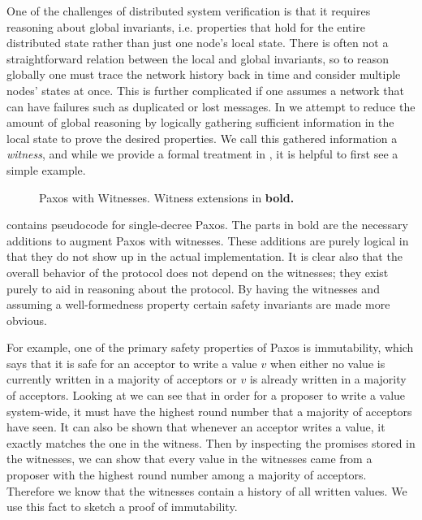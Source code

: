 One of the challenges of distributed system verification is that it requires reasoning about
global invariants, i.e. properties that hold for the entire distributed state rather than just
one node's local state.
There is often not a straightforward relation between the local and global invariants, so
to reason globally one must trace the network history back in time and consider multiple
nodes' states at once.
This is further complicated if one assumes a network that can have failures such as duplicated
or lost messages.
In \sysname{} we attempt to reduce the amount of global reasoning by logically gathering sufficient
information in the local state to prove the desired properties.
We call this gathered information a \textit{witness}, and while we provide a formal treatment
in , it is helpful to first see a simple example.

\begin{figure}[t]
\begin{minipage}{\linewidth}
\noindent
\begin{multicols}{3}
  
\end{multicols}
\end{minipage}
\vspace{-1em}
\caption{Paxos with Witnesses. Witness extensions in \bfseries{bold}.}
\label{fig:paxos-witness}
\vspace{-1em}
\end{figure}

 contains pseudocode for single-decree Paxos.
The parts in bold are the necessary additions to augment Paxos with witnesses.
These additions are purely logical in that they do not show up in the actual implementation.
It is clear also that the overall behavior of the protocol does not depend on the witnesses;
they exist purely to aid in reasoning about the protocol.
By having the witnesses and assuming a well-formedness property certain safety invariants are
made more obvious.

For example, one of the primary safety properties of Paxos is immutability, which says that it
is safe for an acceptor to write a value $v$ when either no value is currently written in a
majority of acceptors or $v$ is already written in a majority of acceptors.
Looking at  we can see that in order for a proposer to write a value system-wide,
it must have the highest round number that a majority of acceptors have seen.
It can also be shown that whenever an acceptor writes a value, it exactly matches the one in the witness.
Then by inspecting the promises stored in the witnesses, we can show that every value in the witnesses
came from a proposer with the highest round number among a majority of acceptors.
Therefore we know that the witnesses contain a history of all written values.
We use this fact to sketch a proof of immutability.

